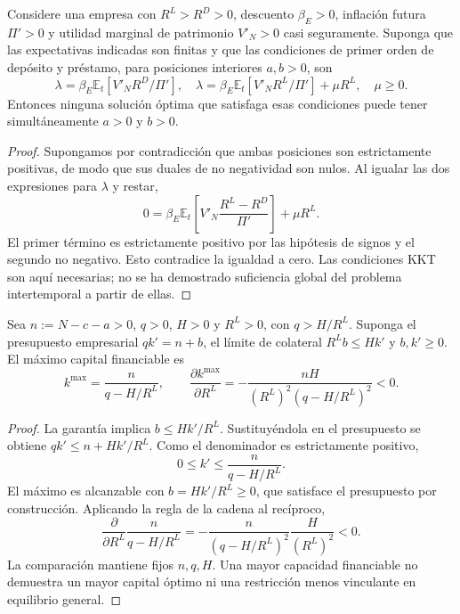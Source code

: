 \begin{lemma}
\label{lem:v0m_original_6_2}
Considere una empresa con $R^L>R^D>0$, descuento
$\beta_E>0$, inflación futura $\Pi'>0$ y
utilidad marginal de patrimonio $V'_N>0$ casi seguramente.
Suponga que las expectativas indicadas son finitas y que
las condiciones de primer orden de depósito y préstamo,
para posiciones interiores $a,b>0$, son
\[
\lambda=\beta_E\mathbb E_t[V'_N R^D/\Pi'],
\quad
\lambda=\beta_E\mathbb E_t[V'_N R^L/\Pi']+\mu R^L,
\quad \mu\geq0.
\]
Entonces ninguna solución óptima que satisfaga esas
condiciones puede tener simultáneamente $a>0$ y $b>0$.
\end{lemma}
\begin{proof}
Supongamos por contradicción que ambas posiciones son
estrictamente positivas, de modo que sus duales de no
negatividad son nulos. Al igualar las dos expresiones para
$\lambda$ y restar,
\[
0=\beta_E\mathbb E_t
\left[V'_N\frac{R^L-R^D}{\Pi'}\right]+\mu R^L.
\]
El primer término es estrictamente positivo por las
hipótesis de signos y el segundo no negativo.
Esto contradice la igualdad a cero. Las condiciones KKT
son aquí necesarias; no se ha demostrado suficiencia global
del problema intertemporal a partir de ellas.
\end{proof}

\begin{proposition}
\label{prop:v0m_original_6_3}
Sea $n:=N-c-a>0$, $q>0$, $H>0$ y $R^L>0$,
con $q>H/R^L$. Suponga el presupuesto empresarial
$qk'=n+b$, el límite de colateral $R^L b\leq Hk'$
y $b,k'\geq0$. El máximo capital financiable es
\[
k^{\max}=\frac{n}{q-H/R^L},\qquad
\frac{\partial k^{\max}}{\partial R^L}
=-\frac{nH}{(R^L)^2(q-H/R^L)^2}<0.
\]
\end{proposition}
\begin{proof}
La garantía implica $b\leq Hk'/R^L$. Sustituyéndola
en el presupuesto se obtiene
$qk'\leq n+Hk'/R^L$. Como el denominador es
estrictamente positivo,
\[
0\leq k'\leq \frac{n}{q-H/R^L}.
\]
El máximo es alcanzable con $b=Hk'/R^L\geq0$,
que satisface el presupuesto por construcción.
Aplicando la regla de la cadena al recíproco,
\[
\frac{\partial}{\partial R^L}
\frac{n}{q-H/R^L}
=-\frac{n}{(q-H/R^L)^2}
\frac{H}{(R^L)^2}<0.
\]
La comparación mantiene fijos $n,q,H$.
Una mayor capacidad financiable no demuestra
un mayor capital óptimo ni una restricción menos
vinculante en equilibrio general.
\end{proof}

